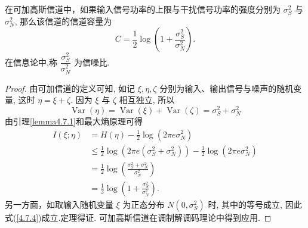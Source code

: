 \begin{theorem}
    在可加高斯信道中，如果输入信号功率的上限与干扰信号功率的强度分别为 $ \sigma_{S}^{2} $ 与 $ \sigma_{N}^{2} $, 那么该信道的信道容量为
\begin{equation}\label{4.7.4}
    C=\frac{1}{2} \log \left(1+\frac{\sigma_{S}^{2}}{\sigma_{N}^{2}}\right) .
\end{equation}
在信息论中,称 $ \dfrac{\sigma_{S}^{2}}{\sigma_{N}^{2}} $ 为信噪比.
\end{theorem}


\begin{proof}
 由可加信道的定义可知, 如记 $ \xi, \eta, \zeta $ 分别为输入、输出信号与噪声的随机变量, 这时 $ \eta=\xi+\zeta $. 因为 $ \xi $ 与 $ \zeta $ 相互独立, 所以
$$
\operatorname{Var}(\eta)=\operatorname{Var}(\xi)+\operatorname{Var}(\zeta)=\sigma_{S}^{2}+\sigma_{N}^{2}
$$
由引理\ref{lemma4.7.1}和最大熵原理可得
$$
\begin{aligned}
I(\xi ; \eta) & =H(\eta)-\frac{1}{2} \log \left(2 \pi e \sigma_{N}^{2}\right) \\
& \leq \frac{1}{2} \log \left(2 \pi e\left(\sigma_{S}^{2}+\sigma_{N}^{2}\right)\right)-\frac{1}{2} \log \left(2 \pi e \sigma_{N}^{2}\right) \\
& =\frac{1}{2} \log \left(\frac{\sigma_{S}^{2}+\sigma_{N}^{2}}{\sigma_{N}^{2}}\right) \\
& =\frac{1}{2} \log \left(1+\frac{\sigma_{S}^{2}}{\sigma_{N}^{2}}\right) .
\end{aligned}
$$
另一方面，如取输入随机变量 $ \xi $ 为正态分布 $ N\left(0, \sigma_{S}^{2}\right) $ 时, 其中的等号成立, 因此式(\ref{4.7.4})成立.定理得证.
可加高斯信道在调制解调码理论中得到应用.
\end{proof}
